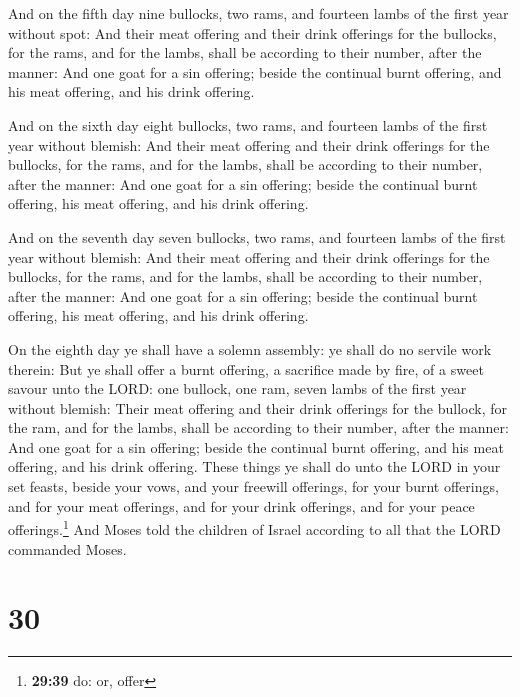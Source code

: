  And on the fifth day nine bullocks, two rams, and
fourteen lambs of the first year without spot:  And their
meat offering and their drink offerings for the bullocks, for the rams,
and for the lambs, shall be according to their number, after the manner:
 And one goat for a sin offering; beside the continual
burnt offering, and his meat offering, and his drink offering.

 And on the sixth day eight bullocks, two rams, and
fourteen lambs of the first year without blemish:  And
their meat offering and their drink offerings for the bullocks, for the
rams, and for the lambs, shall be according to their number, after the
manner:  And one goat for a sin offering; beside the
continual burnt offering, his meat offering, and his drink offering.

 And on the seventh day seven bullocks, two rams, and
fourteen lambs of the first year without blemish:  And
their meat offering and their drink offerings for the bullocks, for the
rams, and for the lambs, shall be according to their number, after the
manner:  And one goat for a sin offering; beside the
continual burnt offering, his meat offering, and his drink offering.

 On the eighth day ye shall have a solemn assembly: ye
shall do no servile work therein:  But ye shall offer a
burnt offering, a sacrifice made by fire, of a sweet savour unto the
LORD: one bullock, one ram, seven lambs of the first year without
blemish:  Their meat offering and their drink offerings
for the bullock, for the ram, and for the lambs, shall be according to
their number, after the manner:  And one goat for a sin
offering; beside the continual burnt offering, and his meat offering,
and his drink offering.  These things ye shall do unto
the LORD in your set feasts, beside your vows, and your freewill
offerings, for your burnt offerings, and for your meat offerings, and
for your drink offerings, and for your peace offerings.\footnote{\textbf{29:39}
  do: or, offer}  And Moses told the children of Israel
according to all that the LORD commanded Moses.

\hypertarget{section-29}{%
\section{30}\label{section-29}}

